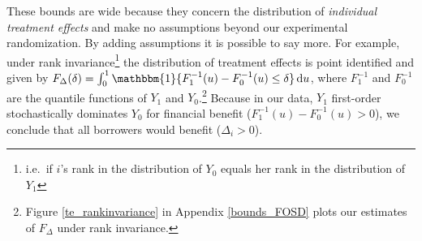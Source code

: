 \documentclass[12pt, a4paper, colorinlistoftodos]{article}
\begin{document}
These bounds are wide because they concern the distribution of \emph{individual treatment effects} and make no assumptions beyond our experimental randomization. 
By adding assumptions it is possible to say more. 
For example, under rank invariance\footnote{i.e.\ if $i$'s rank in the distribution of $Y_0$ equals her rank in the distribution of $Y_1$} the distribution of treatment effects is point identified and given by $F_\Delta(\delta) = \int_0^1 \mathbbm{1}\{ F_1^{-1}(u) - F_0^{-1}(u)\leq \delta\}\,\mathrm{d}u$, where $F_1^{-1}$ and $F_0^{-1}$ are the quantile functions of $Y_1$ and $Y_0$.\footnote{Figure \ref{te_rankinvariance} in Appendix \ref{bounds_FOSD} plots our estimates of $F_\Delta$ under rank invariance.} Because in our data, $Y_1$ first-order stochastically dominates $Y_0$ for financial benefit ($F^{-1}_1(u) - F^{-1}_0(u) >0$), we conclude that all borrowers would benefit ($\Delta_i > 0$). 
\end{document}
